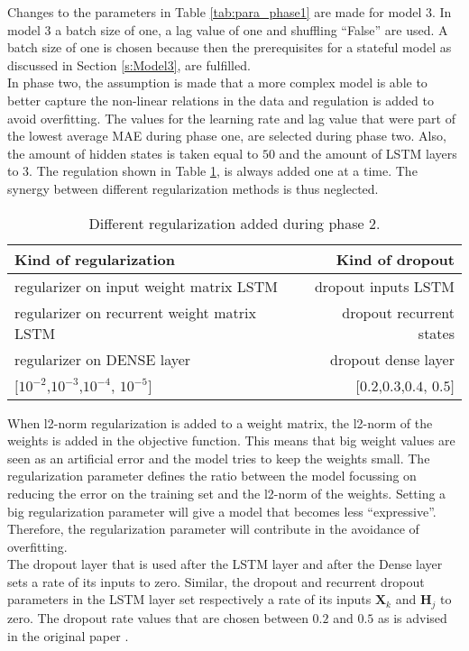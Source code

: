 Changes to the parameters in Table \ref{tab:para_phase1} are made for model $ 3 $. In model $ 3 $ a batch size of one, a lag value of one and shuffling ``False'' are used. A batch size of one is chosen because then the prerequisites for a stateful model as discussed in Section \ref{s:Model3}, are fulfilled.\\

In phase two, the assumption is made that a more complex model is able to better capture the non-linear relations in the data and regulation is added to avoid overfitting. The values for the learning rate and lag value that were part of the lowest average MAE during phase one, are selected during phase two. Also, the amount of hidden states is taken equal to $ 50 $ and the amount of LSTM layers to $ 3 $. The regulation shown in Table \ref{tab:regulation}, is always added one at a time. The synergy between different regularization methods is thus neglected. 

\begin{table}[ht]
	\centering
	\begin{tabular}{@{}l|r@{}} \toprule
		\textbf{Kind of regularization} & 	\textbf{Kind of dropout}\\\midrule
		regularizer on input weight matrix LSTM 	& dropout inputs LSTM\\\hline
		regularizer on recurrent weight matrix LSTM & dropout recurrent states\\\hline
		regularizer on DENSE layer & dropout dense layer\\\hline
		$[ 10^{-2} $,$ 10^{-3} $,$ 10^{-4}$, $ 10^{-5} ]$ & $[ 0.2 $,$ 0.3 $,$ 0.4$, $ 0.5 ]$\\\bottomrule
\end{tabular}
\caption{Different regularization added during phase 2.}
\label{tab:regulation}
\end{table}

When l2-norm regularization is added to a weight matrix, the l2-norm of the weights is added in the objective function. This means that big weight values are seen as an artificial error and the model tries to keep the weights small. The regularization parameter defines the ratio between the model focussing on reducing the error on the training set and the l2-norm of the weights. Setting a big regularization parameter will give a model that becomes less ``expressive''. Therefore, the regularization parameter will contribute in the avoidance of overfitting.\\ 
The dropout layer that is used after the LSTM layer and after the Dense layer sets a rate of its inputs to zero. Similar, the dropout and recurrent dropout parameters in the LSTM layer set respectively a rate of its inputs $ \bm{X}_{k} $ and $ \bm{H}_{j} $ to zero. The dropout rate values that are chosen between $ 0.2 $ and $ 0.5 $ as is advised in the original paper \cite{Mele1993}.\\

